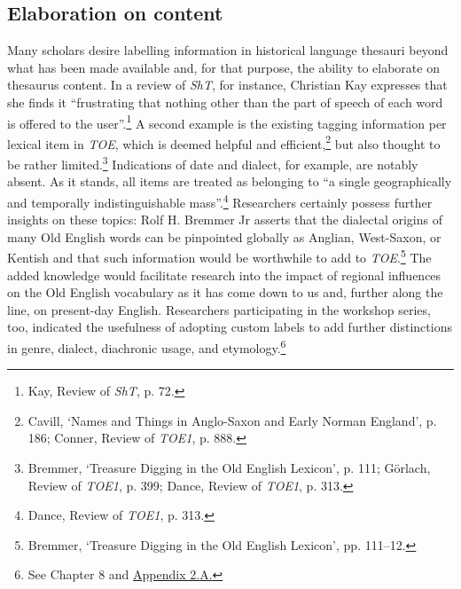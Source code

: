 \subsection{Elaboration on content}

Many scholars desire labelling information in historical language thesauri beyond what has been made available and, for that purpose, the ability to elaborate on thesaurus content. In a review of \textit{ShT}, for instance, Christian Kay expresses that she finds it ``frustrating that nothing other than the part of speech of each word is offered to the user''.\footnote{Kay, Review of \textit{ShT}, p. 72.} A second example is the existing tagging information per lexical item in \textit{TOE}, which is deemed helpful and efficient,\footnote{Cavill, `Names and Things in Anglo-Saxon and Early Norman England', %
p. 186; Conner, Review of \textit{TOE1}, %
p. 888.} but also thought to be rather limited.\footnote{Bremmer, `Treasure Digging in the Old English Lexicon', %
p. 111; Görlach, Review of \textit{TOE1}, p. 399; Dance, Review of \textit{TOE1}, p. 313.} Indications of date and dialect, for example, are notably absent. 
As it stands, all items are treated as belonging to ``a single geographically and temporally indistinguishable mass''.\footnote{Dance, Review of \textit{TOE1}, p. 313.} 
Researchers certainly possess further insights on these topics: Rolf H. Bremmer Jr asserts that the dialectal origins of many Old English words can be pinpointed globally as Anglian, West-Saxon, or Kentish and that such information would be worthwhile to add to \textit{TOE}.\footnote{Bremmer, `Treasure Digging in the Old English Lexicon', pp. 111–12.} The added knowledge would facilitate research into the impact of regional influences on the Old English vocabulary as it has come down to us and, further along the line, on present-day English. Researchers participating in the workshop series, too, indicated the usefulness of adopting custom labels to add further distinctions in genre, dialect, diachronic usage, and etymology.\footnote{See Chapter 8 and \hyperref[Appendix2.A]{Appendix 2.A.}}



